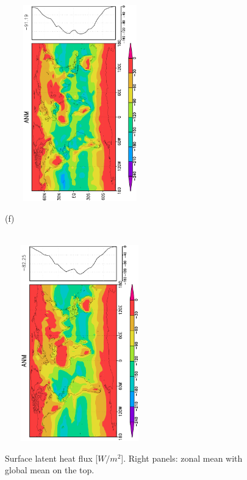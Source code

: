 \documentclass[12pt,a4paper,twoside,openright,headinclude,liststotoc,bibtotoc]{scrreprt}
\begin{document}
\begin{appendix}
\begin{figure}[c]
{\includegraphics[height=8.5cm,width=6.5cm,angle=-90]
{eps/zonaltmslhflu147.eps}
}
\parbox{8.5cm}{\hspace{0.25cm}\begin{scriptsize} (f)\end{scriptsize} \vspace{-0.5cm} \\
\includegraphics[height=8.5cm,width=6.5cm,angle=-90]
{eps/zonalt21tmslhfl147final.eps}
}
\caption[Surface latent heat flux]{Surface latent heat flux [$W/m^{2}$]. Right panels: zonal mean with global mean on the top.}
\label{img:slhfl}
\end{figure}



\end{appendix}
\end{document}
